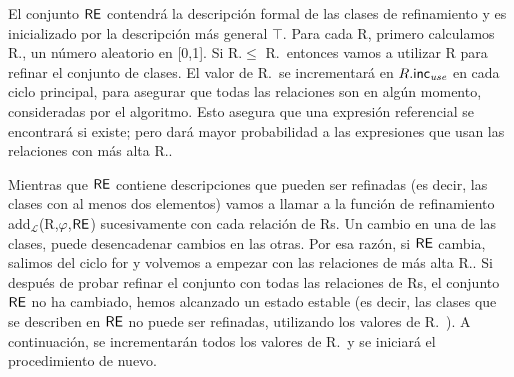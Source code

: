 


El conjunto $\textsf{RE}$ contendr\'a la descripci\'on formal de las clases de refinamiento
y es inicializado por la descripci\'on m\'as general $\top$.
Para cada R, primero calculamos R.\randomuse, un n\'umero aleatorio en [0,1].
Si R.\randomuse $\le$ R.\puse\ entonces vamos a utilizar R para refinar el conjunto de
clases. El valor de R.\puse\ se incrementar\'a en $R.\textsf{inc}_\emph{use}$
en cada ciclo principal, para asegurar que todas las relaciones son en alg\'un momento,
consideradas por el algoritmo. Esto asegura que una expresi\'on referencial
se encontrar\'a si existe; pero dar\'a mayor probabilidad a las expresiones
que usan las relaciones con m\'as alta R.\puse.
 
Mientras que $\textsf{RE}$ contiene descripciones que pueden ser refinadas (es decir, las clases
con al menos dos elementos) vamos a llamar a la funci\'on de refinamiento
add$_\mathcal{L}$(R,$\varphi$,$\textsf{RE}$) sucesivamente con cada relaci\'on
de Rs. Un cambio en una de las clases, puede desencadenar cambios en
las otras. Por esa raz\'on, si $\textsf{RE}$ cambia, salimos del ciclo for y volvemos a
empezar con las relaciones de m\'as alta R.\puse. Si despu\'es de probar refinar el conjunto con todas las relaciones de Rs, el conjunto $\textsf{RE}$ no ha
cambiado, hemos alcanzado un estado estable (es decir, las clases que se describen
en $\textsf{RE}$ no puede ser refinadas, utilizando los valores de R.\puse\ ). 
A continuaci\'on, se incrementar\'an todos los valores de R.\puse\ y se iniciar\'a el
procedimiento de nuevo.

